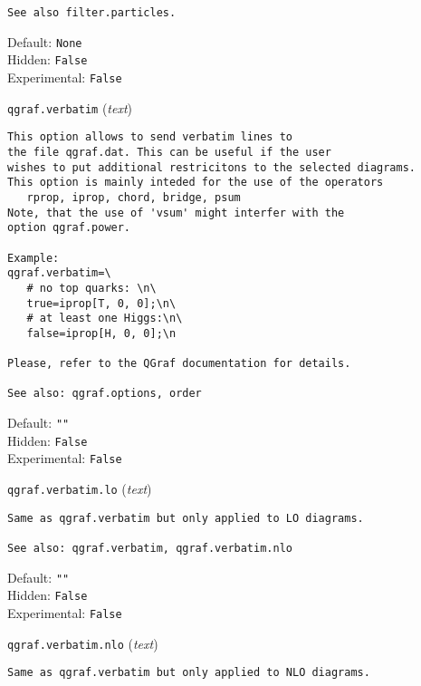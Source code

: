 \begin{basedescript}{\desclabelstyle{\pushlabel}}
\begin{verbatim}
See also filter.particles.
\end{verbatim}
Default: \verb|None|
\\Hidden: \verb|False|
\\Experimental: \verb|False|
\\\item[\colorbox{gray!30}{\texttt{qgraf.verbatim}}] (\textit{text})
\begin{verbatim}
This option allows to send verbatim lines to
the file qgraf.dat. This can be useful if the user
wishes to put additional restricitons to the selected diagrams.
This option is mainly inteded for the use of the operators
   rprop, iprop, chord, bridge, psum
Note, that the use of 'vsum' might interfer with the
option qgraf.power.

Example:
qgraf.verbatim=\
   # no top quarks: \n\
   true=iprop[T, 0, 0];\n\
   # at least one Higgs:\n\
   false=iprop[H, 0, 0];\n

Please, refer to the QGraf documentation for details.

See also: qgraf.options, order
\end{verbatim}
Default: \verb|""|
\\Hidden: \verb|False|
\\Experimental: \verb|False|
\\\item[\colorbox{gray!30}{\texttt{qgraf.verbatim.lo}}] (\textit{text})
\begin{verbatim}
Same as qgraf.verbatim but only applied to LO diagrams.

See also: qgraf.verbatim, qgraf.verbatim.nlo
\end{verbatim}
Default: \verb|""|
\\Hidden: \verb|False|
\\Experimental: \verb|False|
\\\item[\colorbox{gray!30}{\texttt{qgraf.verbatim.nlo}}] (\textit{text})
\begin{verbatim}
Same as qgraf.verbatim but only applied to NLO diagrams.


\end{verbatim}
\end{basedescript}
